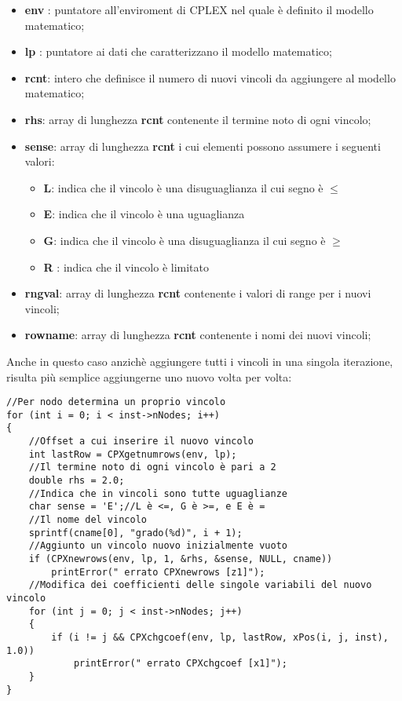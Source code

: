 \documentclass[11pt]{article}
\begin{document}
\begin{itemize}
\item \textbf{env} : puntatore all'enviroment di CPLEX nel quale è definito il modello matematico;
\item \textbf{lp} : puntatore ai dati che caratterizzano il modello matematico;
\item \textbf{rcnt}: intero che definisce il numero di nuovi vincoli da aggiungere al modello matematico;
\item \textbf{rhs}: array di lunghezza \textbf{rcnt} contenente il termine noto di ogni vincolo;
\item \textbf{sense}: array di lunghezza \textbf{rcnt} i cui elementi possono assumere i seguenti valori:

\begin{itemize}
\item \textbf{L}: indica che il vincolo è una disuguaglianza il cui segno è  $\leq$
\item \textbf{E}: indica che il vincolo è una uguaglianza
\item \textbf{G}: indica che il vincolo è una disuguaglianza il cui segno è $\geq$
\item \textbf{R} : indica che il vincolo è limitato 
\end{itemize}

\item \textbf{rngval}: array di lunghezza \textbf{rcnt} contenente i valori di range per i nuovi vincoli;
\item \textbf{rowname}:  array di lunghezza \textbf{rcnt} contenente i nomi dei nuovi vincoli;
\end{itemize}

Anche in questo caso anzichè aggiungere tutti i vincoli in una singola iterazione, risulta più semplice aggiungerne uno nuovo volta per volta:

\begin{lstlisting}
//Per nodo determina un proprio vincolo
for (int i = 0; i < inst->nNodes; i++)
{
    //Offset a cui inserire il nuovo vincolo
    int lastRow = CPXgetnumrows(env, lp);
    //Il termine noto di ogni vincolo è pari a 2
    double rhs = 2.0;
    //Indica che in vincoli sono tutte uguaglianze
    char sense = 'E';//L è <=, G è >=, e E è =
    //Il nome del vincolo
    sprintf(cname[0], "grado(%d)", i + 1);
    //Aggiunto un vincolo nuovo inizialmente vuoto
    if (CPXnewrows(env, lp, 1, &rhs, &sense, NULL, cname)) 
        printError(" errato CPXnewrows [z1]");
    //Modifica dei coefficienti delle singole variabili del nuovo vincolo
    for (int j = 0; j < inst->nNodes; j++)
    {
        if (i != j && CPXchgcoef(env, lp, lastRow, xPos(i, j, inst), 1.0))
            printError(" errato CPXchgcoef [x1]");
    }
}
\end{lstlisting}
\end{document}
